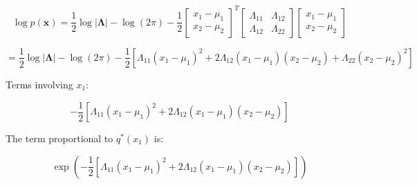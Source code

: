 \documentclass[a3paper,12pt]{extarticle} %
\begin{document}
\begin{enumerate}
\[
\log p(\mathbf{x}) = \frac{1}{2} \log |\boldsymbol{\Lambda}| - \log (2\pi) - \frac{1}{2} \begin{bmatrix} x_1 - \mu_1 \\ x_2 - \mu_2 \end{bmatrix}^T \begin{bmatrix} \Lambda_{11} & \Lambda_{12} \\ \Lambda_{12} & \Lambda_{22} \end{bmatrix} \begin{bmatrix} x_1 - \mu_1 \\ x_2 - \mu_2 \end{bmatrix}
\]

\[
= \frac{1}{2} \log |\boldsymbol{\Lambda}| - \log (2\pi) - \frac{1}{2} \left[ \Lambda_{11} (x_1 - \mu_1)^2 + 2 \Lambda_{12} (x_1 - \mu_1)(x_2 - \mu_2) + \Lambda_{22} (x_2 - \mu_2)^2 \right]
\]

Terms involving \(x_1\):

\[
-\frac{1}{2} \left[ \Lambda_{11} (x_1 - \mu_1)^2 + 2 \Lambda_{12} (x_1 - \mu_1)(x_2 - \mu_2) \right]
\]

The term proportional to \(q^*(x_1)\) is:

\[
\exp\left( -\frac{1}{2} \left[ \Lambda_{11} (x_1 - \mu_1)^2 + 2 \Lambda_{12} (x_1 - \mu_1)(x_2 - \mu_2) \right] \right)
\]


\end{enumerate}
\end{document}
